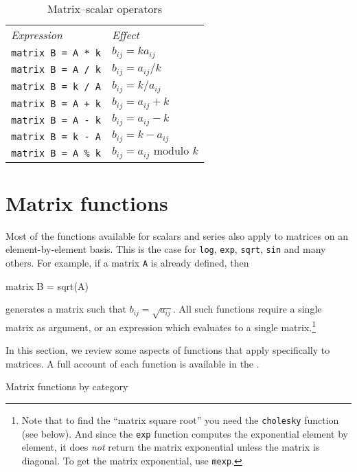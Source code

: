 \begin{table}[htbp]
\centering
\begin{tabular}{ll}
\textit{Expression} & \textit{Effect} \\[4pt]
\texttt{matrix B = A * k} & $b_{ij} = k a_{ij}$ \\
\texttt{matrix B = A / k} & $b_{ij} = a_{ij} / k$ \\
\texttt{matrix B = k / A} & $b_{ij} = k / a_{ij}$ \\
\texttt{matrix B = A + k} & $b_{ij} = a_{ij} + k$ \\
\texttt{matrix B = A - k} & $b_{ij} = a_{ij} - k$ \\
\texttt{matrix B = k - A} & $b_{ij} = k - a_{ij}$ \\
\texttt{matrix B = A \% k} & $b_{ij} = a_{ij} \mbox{ modulo } k$ \\
\end{tabular}
\caption{Matrix--scalar operators}
\label{tab:matrix-scalar-ops}
\end{table}


\section{Matrix functions}
\label{sec:matrix-func}

Most of the functions available for scalars and series also apply to
matrices on an element-by-element basis. This is the case for
\texttt{log}, \texttt{exp}, \texttt{sqrt}, \texttt{sin} and many
others. For example, if a matrix \texttt{A} is already defined, then
%
\begin{code}
matrix B = sqrt(A)
\end{code}
%
generates a matrix such that $b_{ij} = \sqrt{a_{ij}}$.  All such
functions require a single matrix as argument, or an expression which
evaluates to a single matrix.\footnote{Note that to find the ``matrix
  square root'' you need the \texttt{cholesky} function (see below).
  And since the \texttt{exp} function computes the exponential element
  by element, it does \emph{not} return the matrix exponential unless
  the matrix is diagonal. To get the matrix exponential, use
  \texttt{mexp}.}

In this section, we review some aspects of functions that apply
specifically to matrices. A full account of each function is available
in the \GCR.

\newlength{\cwid}
\setlength{\cwid}{0.1\textwidth}

\begin{table}[htbp]
\centering

\caption{Matrix functions by category}
\label{tab:matrix_funcs_cat}
\end{table}

